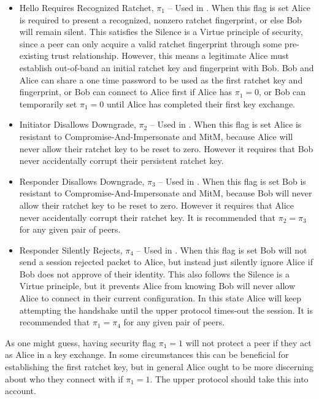 \documentclass{article}
\begin{document}
\begin{itemize}
	\item Hello Requires Recognized Ratchet, $\pi_1$ -- Used in . When this flag is set Alice is required to present a recognized, nonzero ratchet fingerprint, or else Bob will remain silent. This satisfies the Silence is a Virtue principle of security, since a peer can only acquire a valid ratchet fingerprint through some pre-existing trust relationship. However, this means a legitimate Alice must establish out-of-band an initial ratchet key and fingerprint with Bob. Bob and Alice can share a one time password to be used as the first ratchet key and fingerprint, or Bob can connect to Alice first if Alice has $\pi_1=0$, or Bob can temporarily set $\pi_1=0$ until Alice has completed their first key exchange.
	\item Initiator Disallows Downgrade, $\pi_2$ -- Used in . When this flag is set Alice is resistant to Compromise-And-Impersonate and MitM, because Alice will never allow their ratchet key to be reset to zero. However it requires that Bob never accidentally corrupt their persistent ratchet key.
	\item Responder Disallows Downgrade, $\pi_3$ -- Used in . When this flag is set Bob is resistant to Compromise-And-Impersonate and MitM, because Bob will never allow their ratchet key to be reset to zero. However it requires that Alice never accidentally corrupt their ratchet key. It is recommended that $\pi_2=\pi_3$ for any given pair of peers.
	\item Responder Silently Rejects, $\pi_4$ -- Used in . When this flag is set Bob will not send a session rejected packet to Alice, but instead just silently ignore Alice if Bob does not approve of their identity. This also follows the Silence is a Virtue principle, but it prevents Alice from knowing Bob will never allow Alice to connect in their current configuration. In this state Alice will keep attempting the handshake until the upper protocol times-out the session. It is recommended that $\pi_1=\pi_4$ for any given pair of peers.
\end{itemize}

As one might guess, having security flag $\pi_1 = 1$ will not protect a peer if they act as Alice in a key exchange. In some circumstances this can be beneficial for establishing the first ratchet key, but in general Alice ought to be more discerning about who they connect with if $\pi_1 = 1$. The upper protocol should take this into account.
\end{document}
